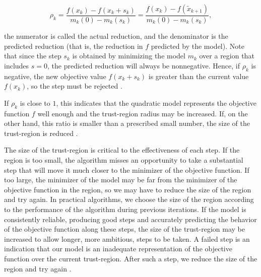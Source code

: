 \begin{equation}\label{agreement}
    \rho_k = \frac{f(x_k) - f(x_k + s_k)}{m_k(0) - m_k(s_k)} = \frac{f(x_k) - f(\widetilde{x}_{k+1})}{m_k(0) - m_k(s_k)},
\end{equation}

the numerator is called the actual reduction, and the denominator is the predicted reduction (that is, the reduction in $f$ predicted by the model). Note that since the step $s_k$ is obtained by minimizing the model $m_k$ over a region that includes $s = 0$, the predicted reduction will always be nonnegative. Hence, if $\rho_k$ is negative, the new objective value $f(x_k + s_k)$ is greater than the current value $f(x_k)$, so the step must be rejected \cite[p.~68-69]{NocedalWright:2006}.

If $\rho_k$ is close to $1$, this indicates that the quadratic model represents the objective function $f$ well enough and the trust-region radius may be increased. If, on the other hand, this ratio is smaller than a
prescribed small number, the size of the trust-region is reduced \cite[p.~1027]{ByrdKhalfanSchnabel:1996}. 

The size of the trust-region is critical to the effectiveness of each step. If the region is too small, the algorithm misses an opportunity to take a substantial step that will move it much closer to the minimizer of the objective function. If too large, the minimizer of the model may be far from the minimizer of the objective function in the region, so we may have to reduce the size of the region and try again. In practical algorithms, we choose the size of the region according to the performance of the algorithm during previous iterations. If the model is consistently reliable, producing good steps and accurately predicting the behavior of the objective function along these steps, the size of the trust-region may be increased to allow longer, more ambitious, steps to be taken. A failed step is an indication that our model is an inadequate representation of the objective function over the current trust-region. After such a step, we reduce the size of the region and try again \cite[p.~67]{NocedalWright:2006}.

